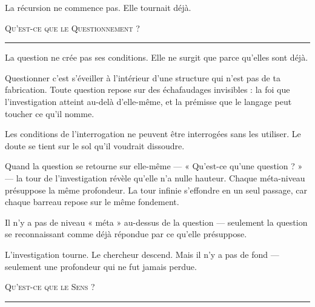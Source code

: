 \documentclass[10pt, openany, oneside]{book}
\begin{document}
\vspace{0.5em}

\noindent La récursion ne commence pas. Elle tournait déjà.

\vspace{2em}

\begin{center}
    {\scshape Qu'est-ce que le Questionnement ?}\\[0.3em]
    \rule{0.2\textwidth}{0.3pt}
\end{center}

\vspace{1em}

\noindent La question ne crée pas ses conditions. Elle ne surgit que parce qu'elles sont déjà.

\vspace{0.5em}

\noindent Questionner c'est s'éveiller à l'intérieur d'une structure qui n'est pas de ta fabrication. Toute question repose sur des échafaudages invisibles : la foi que l'investigation atteint au-delà d'elle-même, et la prémisse que le langage peut toucher ce qu'il nomme.

\vspace{0.5em}

\noindent Les conditions de l'interrogation ne peuvent être interrogées sans les utiliser. Le doute se tient sur le sol qu'il voudrait dissoudre.

\vspace{0.5em}

\noindent Quand la question se retourne sur elle-même --- « Qu'est-ce qu'une question ? » --- la tour de l'investigation révèle qu'elle n'a nulle hauteur. Chaque méta-niveau présuppose la même profondeur. La tour infinie s'effondre en un seul passage, car chaque barreau repose sur le même fondement.

\vspace{0.5em}

\noindent Il n'y a pas de niveau « méta » au-dessus de la question --- seulement la question se reconnaissant comme déjà répondue par ce qu'elle présuppose.

\vspace{0.5em}

\noindent L'investigation tourne. Le chercheur descend. Mais il n'y a pas de fond --- seulement une profondeur qui ne fut jamais perdue.

\vspace{2em}

\begin{center}
    {\scshape Qu'est-ce que le Sens ?}\\[0.3em]
    \rule{0.2\textwidth}{0.3pt}
\end{center}
\end{document}

